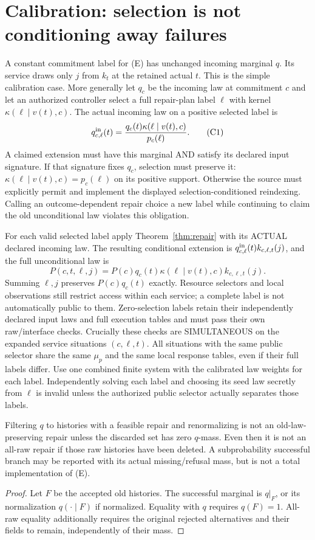 \documentclass[11pt]{article}
\begin{document}
\section{Calibration: selection is not conditioning away failures}
A constant commitment label for (E) has unchanged incoming marginal $q$. Its service draws only $j$ from $k_t$ at the retained actual $t$. This is the simple calibration case. More generally let $q_c$ be the incoming law at commitment $c$ and let an authorized controller select a full repair-plan label $\ell$ with kernel $\kappa(\ell\mid v(t),c)$. The actual incoming law on a positive selected label is
\[
 q_{c,\ell}^{\rm in}(t)=
 \frac{q_c(t)\kappa(\ell\mid v(t),c)}{p_c(\ell)}.
\tag{C1}
\]
A claimed extension must have this marginal AND satisfy its declared input signature. If that signature fixes $q_c$, selection must preserve it: $\kappa(\ell\mid v(t),c)=p_c(\ell)$ on its positive support. Otherwise the source must explicitly permit and implement the displayed selection-conditioned reindexing. Calling an outcome-dependent repair choice a new label while continuing to claim the old unconditional law violates this obligation.

For each valid selected label apply Theorem~\ref{thm:repair} with its ACTUAL declared incoming law. The resulting conditional extension is $q_{c,\ell}^{\rm in}(t)k_{c,\ell,t}(j)$, and the full unconditional law is
\[
 P(c,t,\ell,j)=P(c)q_c(t)\kappa(\ell\mid v(t),c)
                       k_{c,\ell,t}(j).
\tag{C2}
\]
Summing $\ell,j$ preserves $P(c)q_c(t)$ exactly. Resource selectors and local observations still restrict access within each service; a complete label is not automatically public to them. Zero-selection labels retain their independently declared input laws and full execution tables and must pass their own raw/interface checks. Crucially these checks are SIMULTANEOUS on the expanded service situations $(c,\ell,t)$. All situations with the same public selector share the same $\mu_p$ and the same local response tables, even if their full labels differ. Use one combined finite system with the calibrated law weights for each label. Independently solving each label and choosing its seed law secretly from $\ell$ is invalid unless the authorized public selector actually separates those labels.

\begin{proposition}
Filtering $q$ to histories with a feasible repair and renormalizing is not an old-law-preserving repair unless the discarded set has zero $q$-mass. Even then it is not an all-raw repair if those raw histories have been deleted. A subprobability successful branch may be reported with its actual missing/refusal mass, but is not a total implementation of (E).
\end{proposition}
\begin{proof}
Let $F$ be the accepted old histories. The successful marginal is $q|_F$, or its normalization $q(\cdot\mid F)$ if normalized. Equality with $q$ requires $q(F)=1$. All-raw equality additionally requires the original rejected alternatives and their fields to remain, independently of their mass.\end{proof}
\end{document}
